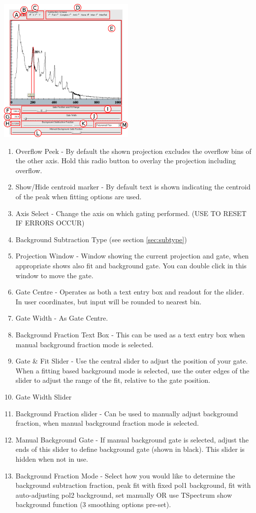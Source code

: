 \documentclass[a4paper,10pt]{article}
\begin{document}
\begin{center}
\includegraphics[width=0.5\textwidth]{toolB.png}
\end{center}
\begin{enumerate}
\item Overflow Peek - By default the shown projection excludes the overflow bins of the other axis. Hold this radio button to overlay the projection including overflow.
\item Show/Hide centroid marker - By default text is shown indicating the centroid of the peak when fitting options are used.
\item Axis Select - Change the axis on which gating performed. (USE TO RESET IF ERRORS OCCUR)
\item Background Subtraction Type (see section \ref{sec:subtype})
\item Projection Window - Window showing the current projection and gate, when appropriate shows also fit and background gate. You can double click in this window to move the gate.
\item Gate Centre - Operates as both a text entry box and readout for the slider. In user coordinates, but input will be rounded to nearest bin. 
\item Gate Width - As Gate Centre. 
\item Background Fraction Text Box - This can be used as a text entry box when manual background fraction mode is selected.
\item Gate \& Fit Slider - Use the central slider to adjust the position of your gate. When a fitting based background mode is selected, use the outer edges of the slider to adjust the range of the fit, relative to the gate position.
\item Gate Width Slider
\item Background Fraction slider - Can be used to manually adjust background fraction, when manual background fraction mode is selected.
\item Manual Background Gate - If manual background gate is selected, adjust the ends of this slider to define background gate (shown in black). This slider is hidden when not in use.
\item Background Fraction Mode -
Select how you would like to determine the background subtraction fraction, peak fit with fixed pol1 background, fit with auto-adjusting pol2 background, set manually OR use TSpectrum show background function (3 smoothing options pre-set).


\end{enumerate}
\end{document}
